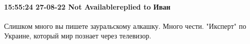  
 
 
 
 

\paragraph{15:55:24 27-08-22 Not Availablereplied to Иван}

Слишком много вы пишете зауральскому алкашку. Много чести. "Иксперт" по
Украине, который мир познает через телевизор.
